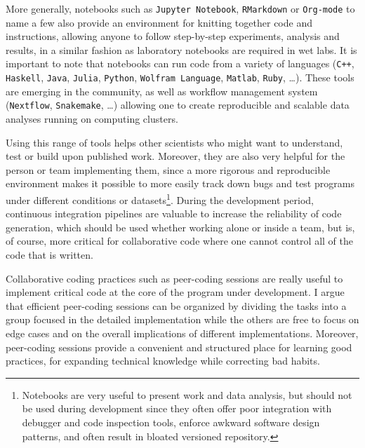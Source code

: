 More generally, notebooks such as \texttt{Jupyter Notebook}, \texttt{RMarkdown} or \texttt{Org-mode} to name a few also provide an environment for knitting together code and instructions, allowing anyone to follow step-by-step experiments, analysis and results, in a similar fashion as laboratory notebooks are required in wet labs.
It is important to note that notebooks can run code from a variety of languages (\texttt{C++}, \texttt{Haskell}, \texttt{Java}, \texttt{Julia}, \texttt{Python}, \texttt{Wolfram Language}, \texttt{Matlab}, \texttt{Ruby}, \ldots).
These tools are emerging in the community, as well as workflow management system (\texttt{Nextflow}, \texttt{Snakemake}, \ldots) allowing one to create reproducible and scalable data analyses running on computing clusters.

Using this range of tools helps other scientists who might want to understand, test or build upon published work.
Moreover, they are also very helpful for the person or team implementing them, since a more rigorous and reproducible environment makes it possible to more easily track down bugs and test programs under different conditions or datasets\footnote{Notebooks are very useful to present work and data analysis, but should not be used during development since they often offer poor integration with debugger and code inspection tools, enforce awkward software design patterns, and often result in bloated versioned repository.}.
During the development period, continuous integration pipelines are valuable to increase the reliability of code generation, which should be used whether working alone or inside a team, but is, of course, more critical for collaborative code where one cannot control all of the code that is written.

Collaborative coding practices such as peer-coding sessions are really useful to implement critical code at the core of the program under development.
I argue that efficient peer-coding sessions can be organized by dividing the tasks into a group focused in the detailed implementation while the others are free to focus on edge cases and on the overall implications of different implementations.
Moreover, peer-coding sessions provide a convenient and structured place for learning good practices, for expanding technical knowledge while correcting bad habits.

